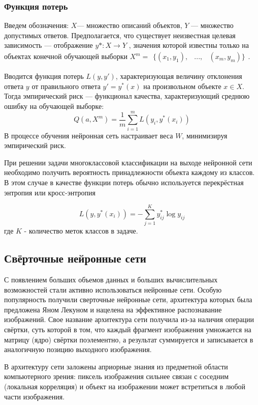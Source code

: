 \subsubsection{Функция потерь}
Введем обозначения: $X$— множество описаний объектов, $Y$ — множество допустимых ответов. Предполагается, что существует неизвестная целевая зависимость — отображение $y* : X \rightarrow Y$ , значения которой известны только на объектах конечной обучающей выборки 
$X^m = \begin{matrix}\{ (x_1, y_1), & ..., & (x_m, y_m)  \}\end{matrix}$.

Вводится функция потерь $L(y, y')$, характеризующая величину отклонения ответа $y$ от правильного ответа $y' = y^*(x)$ на произвольном объекте $x \in X$. Тогда эмпирический риск \cite{classification} — функционал качества, характеризующий среднюю ошибку на обучающей выборке:
\[
    Q(a,X^m)= \dfrac{1}{m} \sum^m_{i=1} L(y_i,y^*(x_i))
\]
В процессе обучения нейронная сеть настраивает веса $W$, минимизируя эмпирический риск.

При решении задачи многоклассовой классификации на выходе нейронной сети необходимо получить вероятность принадлежности объекта каждому из классов. В этом случае в качестве функции потерь обычно используется перекрёстная энтропия или кросс-энтропия

\[
L(y, y^*(x_i)) = -\sum^K_{j=1}y^*_{ij} \log y_{ij}
\]
где $K$ - количество меток классов в задаче.
 
\subsection{Свёрточные нейронные сети} \label{convnets}
С появлением больших объемов данных и больших вычислительных возможностей стали активно использоваться нейронные сети. Особую популярность получили сверточные нейронные сети, архитектура которых была предложена Яном Лекуном \cite{LeCun1998GradientbasedLA} и нацелена на эффективное распознавание изображений. Свое название архитектура сети получила из-за наличия операции свёртки, суть которой в том, что каждый фрагмент изображения умножается на матрицу (ядро) свёртки поэлементно, а результат суммируется и записывается в аналогичную позицию выходного изображения. 

В архитектуру сети заложены априорные знания из предметной области компьютерного зрения: пиксель изображения сильнее связан с соседним (локальная корреляция) и объект на изображении может встретиться в любой части изображения.

